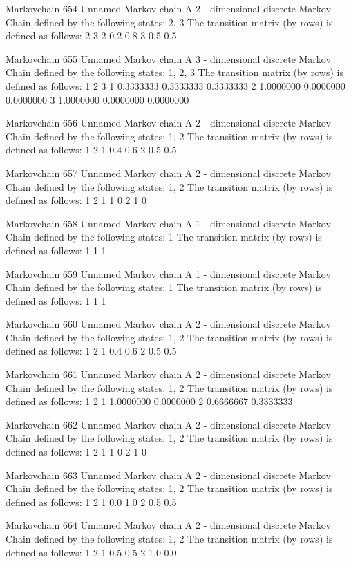 \documentclass[
  nojss]{jss}
\begin{document}
\begin{CodeChunk}
\begin{CodeOutput}
Markovchain  654 
Unnamed Markov chain 
 A  2 - dimensional discrete Markov Chain defined by the following states: 
 2, 3 
 The transition matrix  (by rows)  is defined as follows: 
    2   3
2 0.2 0.8
3 0.5 0.5

Markovchain  655 
Unnamed Markov chain 
 A  3 - dimensional discrete Markov Chain defined by the following states: 
 1, 2, 3 
 The transition matrix  (by rows)  is defined as follows: 
          1         2         3
1 0.3333333 0.3333333 0.3333333
2 1.0000000 0.0000000 0.0000000
3 1.0000000 0.0000000 0.0000000

Markovchain  656 
Unnamed Markov chain 
 A  2 - dimensional discrete Markov Chain defined by the following states: 
 1, 2 
 The transition matrix  (by rows)  is defined as follows: 
    1   2
1 0.4 0.6
2 0.5 0.5

Markovchain  657 
Unnamed Markov chain 
 A  2 - dimensional discrete Markov Chain defined by the following states: 
 1, 2 
 The transition matrix  (by rows)  is defined as follows: 
  1 2
1 1 0
2 1 0

Markovchain  658 
Unnamed Markov chain 
 A  1 - dimensional discrete Markov Chain defined by the following states: 
 1 
 The transition matrix  (by rows)  is defined as follows: 
  1
1 1

Markovchain  659 
Unnamed Markov chain 
 A  1 - dimensional discrete Markov Chain defined by the following states: 
 1 
 The transition matrix  (by rows)  is defined as follows: 
  1
1 1

Markovchain  660 
Unnamed Markov chain 
 A  2 - dimensional discrete Markov Chain defined by the following states: 
 1, 2 
 The transition matrix  (by rows)  is defined as follows: 
    1   2
1 0.4 0.6
2 0.5 0.5

Markovchain  661 
Unnamed Markov chain 
 A  2 - dimensional discrete Markov Chain defined by the following states: 
 1, 2 
 The transition matrix  (by rows)  is defined as follows: 
          1         2
1 1.0000000 0.0000000
2 0.6666667 0.3333333

Markovchain  662 
Unnamed Markov chain 
 A  2 - dimensional discrete Markov Chain defined by the following states: 
 1, 2 
 The transition matrix  (by rows)  is defined as follows: 
  1 2
1 1 0
2 1 0

Markovchain  663 
Unnamed Markov chain 
 A  2 - dimensional discrete Markov Chain defined by the following states: 
 1, 2 
 The transition matrix  (by rows)  is defined as follows: 
    1   2
1 0.0 1.0
2 0.5 0.5

Markovchain  664 
Unnamed Markov chain 
 A  2 - dimensional discrete Markov Chain defined by the following states: 
 1, 2 
 The transition matrix  (by rows)  is defined as follows: 
    1   2
1 0.5 0.5
2 1.0 0.0


\end{CodeOutput}
\end{CodeChunk}
\end{document}
